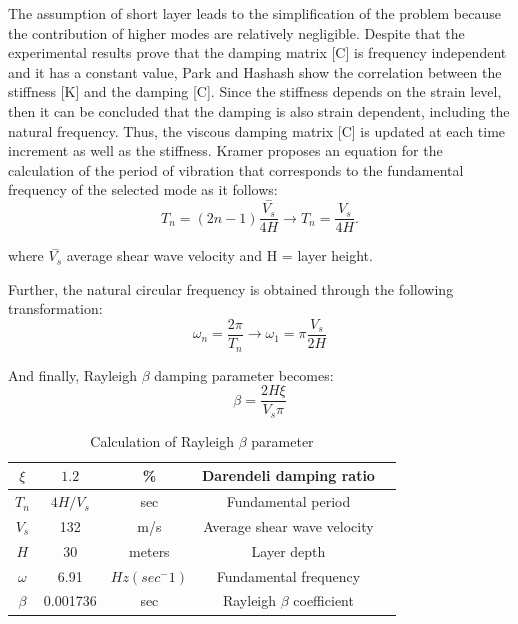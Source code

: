 \documentclass[10pt,a4paper]{report}
\begin{document}
The assumption of short layer leads to the simplification of the problem because the contribution of higher modes are relatively negligible. Despite that the experimental results prove that the damping matrix [C] is frequency independent and it has a constant value, Park and Hashash show the correlation between the stiffness [K] and the damping [C]. Since the stiffness depends on the strain level, then it can be concluded that the damping is also strain dependent, including the natural frequency. Thus, the viscous damping matrix [C] is updated at each time increment as well as the stiffness. Kramer proposes an equation for the calculation of the period of vibration that corresponds to the fundamental frequency of the selected mode as it follows:
\begin{equation}
	T_n=(2n-1)\frac{\stackrel{-}{{V}_{s}}}{4H}\longrightarrow T_n=\frac{V_s}{4H}.
\end{equation}

where $\stackrel{-}{{V}_{s}}$ average shear wave velocity and H = layer height.

Further, the natural circular frequency is obtained through the following transformation:
	\begin{equation}
\omega_n=\frac{2\pi}{T_n} \rightarrow \omega_1=\pi\frac{V_s}{2H}
	\end{equation}

And finally, Rayleigh $\beta$ damping parameter becomes:
\begin{equation}
	\beta=\frac{2H\xi}{V_s\pi}
\end{equation}
 
 \begin{table}[h!]
 	\centering
 	\begin{tabular}{|c|c|c|c|c|}
 		\hline $\xi$         &       $1.2$    &  \%    &  Darendeli damping ratio      \\ 
 		\hline $T_n$    & $4H/V_s$ &  sec &  Fundamental period\\ 
 		\hline $V_s$  & 132  &  m/s &  Average shear wave velocity\\ 
 		\hline $H$ & 30 &  meters &  Layer depth\\
 		\hline $\omega$ & 6.91 & $Hz (sec^-1)$ & Fundamental frequency\\
 		\hline $\beta$ & 0.001736 & sec & Rayleigh $\beta$ coefficient\\
 		\hline
 	\end{tabular} 
 	\caption{Calculation of Rayleigh $\beta$ parameter}
 	\label{beta_param}
 \end{table}
\end{document}
